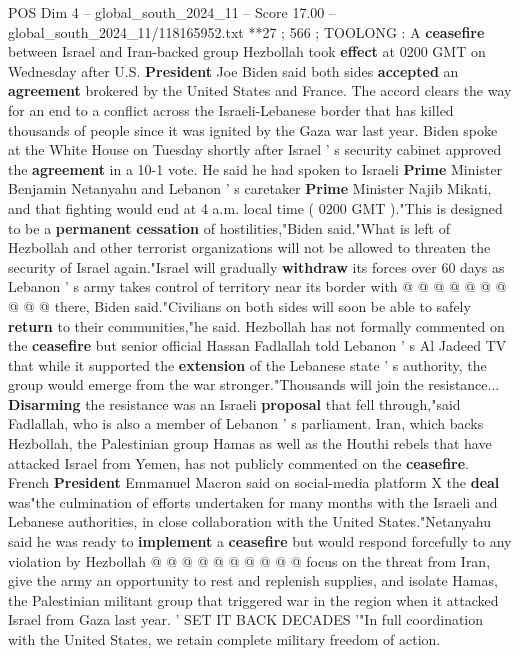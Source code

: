 \begin{textsample}{POS Dim 4 – global\_south\_2024\_11 – Score 17.00 – global\_south\_2024\_11/118165952.txt}  \label{ex:f4_pos_255}
**27 ; 566 ; TOOLONG : A \textbf{ceasefire} between Israel and Iran-backed group Hezbollah took \textbf{effect} at 0200 GMT on Wednesday after U.S. \textbf{President} Joe Biden said both sides \textbf{accepted} an \textbf{agreement} brokered by the United States and France.
The accord clears the way for an end to a conflict across the Israeli-Lebanese border that has killed thousands of people since it was ignited by the Gaza war last year.
Biden spoke at the White House on Tuesday shortly after Israel ' s security cabinet approved the \textbf{agreement} in a 10-1 vote.
He said he had spoken to Israeli \textbf{Prime} Minister Benjamin Netanyahu and Lebanon ' s caretaker \textbf{Prime} Minister Najib Mikati, and that fighting would end at 4 a.m. local time ( 0200 GMT )."This is designed to be a \textbf{permanent} \textbf{cessation} of hostilities,"Biden said."What is left of Hezbollah and other terrorist organizations will not be allowed to threaten the security of Israel again."Israel will gradually \textbf{withdraw} its forces over 60 days as Lebanon ' s army takes control of territory near its border with @ @ @ @ @ @ @ @ @ @ there, Biden said."Civilians on both sides will soon be able to safely \textbf{return} to their communities,"he said.
Hezbollah has not formally commented on the \textbf{ceasefire} but senior official Hassan Fadlallah told Lebanon ' s Al Jadeed TV that while it supported the \textbf{extension} of the Lebanese state ' s authority, the group would emerge from the war stronger."Thousands will join the resistance... \textbf{Disarming} the resistance was an Israeli \textbf{proposal} that fell through,"said Fadlallah, who is also a member of Lebanon ' s parliament.
Iran, which backs Hezbollah, the Palestinian group Hamas as well as the Houthi rebels that have attacked Israel from Yemen, has not publicly commented on the \textbf{ceasefire}.
French \textbf{President} Emmanuel Macron said on social-media platform X the \textbf{deal} was"the culmination of efforts undertaken for many months with the Israeli and Lebanese authorities, in close collaboration with the United States."Netanyahu said he was ready to \textbf{implement} a \textbf{ceasefire} but would respond forcefully to any violation by Hezbollah @ @ @ @ @ @ @ @ @ @ focus on the threat from Iran, give the army an opportunity to rest and replenish supplies, and isolate Hamas, the Palestinian militant group that triggered war in the region when it attacked Israel from Gaza last year. ' SET IT BACK DECADES '"In full coordination with the United States, we retain complete military freedom of action.

\end{textsample}
